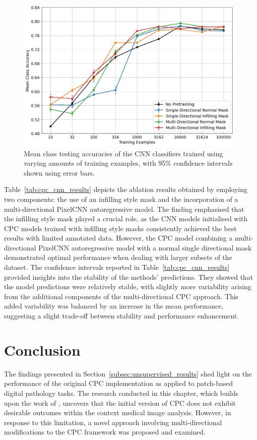 \begin{figure}[tb]
	\centering
	\includegraphics[width=\textwidth]{images/cpc_cnn_results.png}
	\caption{Mean class testing accuracies of the CNN classifiers trained using varying amounts of training examples, with 95\% confidence intervals shown using error bars.}
	\label{fig:cpc_cnn_results}
\end{figure}

Table~\ref{tab:cpc_cnn_results} depicts the ablation results obtained by employing two components: the use of an infilling style mask and the incorporation of a multi-directional PixelCNN autoregressive model. The finding emphasised that the infilling style mask played a crucial role, as the CNN models initialised with CPC models trained with infilling style masks consistently achieved the best results with limited annotated data. However, the CPC model combining a multi-directional PixelCNN autoregressive model with a normal single directional mask demonstrated optimal performance when dealing with larger subsets of the dataset. The confidence intervals reported in Table~\ref{tab:cpc_cnn_results} provided insights into the stability of the methods' predictions. They showed that the model predictions were relatively stable, with slightly more variability arising from the additional components of the multi-directional CPC approach. This added variability was balanced by an increase in the mean performance, suggesting a slight trade-off between stability and performance enhancement.



\section{Conclusion}
\label{sec:conclusion}
The findings presented in Section~\ref{subsec:unsupervised_results} shed light on the performance of the original CPC implementation as applied to patch-based digital pathology tasks. The research conducted in this chapter, which builds upon the work of \cite{oord2018representation}, uncovers that the initial version of CPC does not exhibit desirable outcomes within the context medical image analysis. However, in response to this limitation, a novel approach involving multi-directional modifications to the CPC framework was proposed and examined. 


